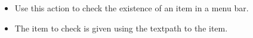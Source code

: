 
\begin{itemize}
\item Use this action to check the existence of an item in a menu bar.
\item The item to check is given using the textpath to the item.
\end{itemize}
